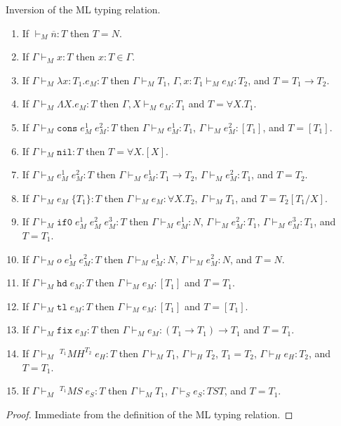 \begin{mi}
\label{mi}
Inversion of the ML typing relation.
\begin{enumerate}
\item If $\vdash_{M}\overline{n}:T$ then $T=N$.
\item If $\Gamma\vdash_{M}x:T$ then $x:T\in\Gamma$.
\item If $\Gamma\vdash_{M}\lambda x:T_{1}.e_{M}:T$ then $\Gamma\vdash_{M}T_{1}$, $\Gamma,x:T_{1}\vdash_{M}e_{M}:T_{2}$, and $T=T_{1}\rightarrow T_{2}$.
\item If $\Gamma\vdash_{M}\Lambda X.e_{M}:T$ then $\Gamma,X\vdash_{M}e_{M}:T_{1}$ and $T=\forall X.T_{1}$.
\item If $\Gamma\vdash_{M}\mathtt{cons}\;e_{M}^{1}\;e_{M}^{2}:T$ then $\Gamma\vdash_{M}e_{M}^{1}:T_{1}$, $\Gamma\vdash_{M}e_{M}^{2}:[T_{1}]$, and $T=[T_{1}]$.
\item If $\Gamma\vdash_{M}\mathtt{nil}:T$ then $T=\forall X.[X]$.
\item If $\Gamma\vdash_{M}e_{M}^{1}\;e_{M}^{2}:T$ then $\Gamma\vdash_{M}e_{M}^{1}:T_{1}\rightarrow T_{2}$, $\Gamma\vdash_{M}e_{M}^{2}:T_{1}$, and $T=T_{2}$.
\item If $\Gamma\vdash_{M}e_{M}\;\lbrace T_{1}\rbrace:T$ then $\Gamma\vdash_{M}e_{M}:\forall X.T_{2}$, $\Gamma\vdash_{M}T_{1}$, and $T=T_{2}[T_{1}/X]$.
\item If $\Gamma\vdash_{M}\mathtt{if0}\;e_{M}^{1}\;e_{M}^{2}\;e_{M}^{3}:T$ then $\Gamma\vdash_{M}e_{M}^{1}:N$, $\Gamma\vdash_{M}e_{M}^{2}:T_{1}$, $\Gamma\vdash_{M}e_{M}^{3}:T_{1}$, and $T=T_{1}$.
\item If $\Gamma\vdash_{M}o\;e_{M}^{1}\;e_{M}^{2}:T$ then $\Gamma\vdash_{M}e_{M}^{1}:N$, $\Gamma\vdash_{M}e_{M}^{2}:N$, and $T=N$.
\item If $\Gamma\vdash_{M}\mathtt{hd}\;e_{M}:T$ then $\Gamma\vdash_{M}e_{M}:[T_{1}]$ and $T=T_{1}$.
\item If $\Gamma\vdash_{M}\mathtt{tl}\;e_{M}:T$ then $\Gamma\vdash_{M}e_{M}:[T_{1}]$ and $T=[T_{1}]$.
\item If $\Gamma\vdash_{M}\mathtt{fix}\;e_{M}:T$ then $\Gamma\vdash_{M}e_{M}:(T_{1}\rightarrow T_{1})\rightarrow T_{1}$ and $T=T_{1}$.
\item If $\Gamma\vdash_{M}\;^{T_{1}}MH^{T_{2}}\;e_{H}:T$ then $\Gamma\vdash_{M}T_{1}$, $\Gamma\vdash_{H}T_{2}$, $T_{1}=T_{2}$, $\Gamma\vdash_{H}e_{H}:T_{2}$, and $T=T_{1}$.
\item If $\Gamma\vdash_{M}\;^{T_{1}}MS\;e_{S}:T$ then $\Gamma\vdash_{M}T_{1}$, $\Gamma\vdash_{S}e_{S}:TST$, and $T=T_{1}$.
\end{enumerate}
\begin{proof}
Immediate from the definition of the ML typing relation.
\end{proof}
\end{mi}